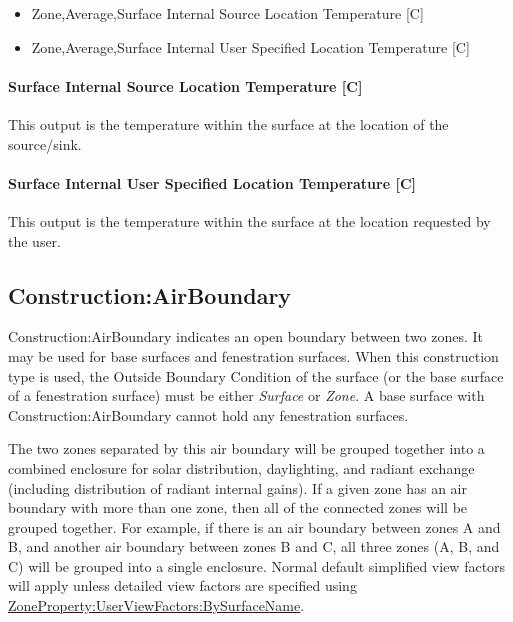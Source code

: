 \begin{itemize}
\item  Zone,Average,Surface Internal Source Location Temperature [C]
\item  Zone,Average,Surface Internal User Specified Location Temperature [C]
\end{itemize}

\paragraph{Surface Internal Source Location Temperature {[}C{]}}\label{surface-internal-source-location-temperature-c}

This output is the temperature within the surface at the location of the source/sink.

\paragraph{Surface Internal User Specified Location Temperature {[}C{]}}\label{surface-internal-user—specified-location-temperature-c}

This output is the temperature within the surface at the location requested by the user.

\subsection{Construction:AirBoundary}\label{constructionairboundary}

Construction:AirBoundary indicates an open boundary between two zones. It may be used for base surfaces and fenestration surfaces.
When this construction type is used, the Outside Boundary Condition of the surface (or the base surface of a fenestration surface)
must be either \textit{Surface} or \textit{Zone}. A base surface with Construction:AirBoundary cannot hold any fenestration surfaces.

The two zones separated by this air boundary will be grouped together into a combined enclosure for solar distribution, daylighting, and radiant exchange (including distribution of radiant internal gains). If a given zone has an air boundary with more than one zone, then all of the connected zones will be grouped together. For example, if there is an air boundary between zones A and B, and another air boundary between zones B and C, all three zones (A, B, and C) will be grouped into a single enclosure. Normal default simplified view factors will apply unless detailed view factors are specified using \hyperref[zonepropertyuserviewfactorsbysurfacename]{ZoneProperty:UserViewFactors:BySurfaceName}.

